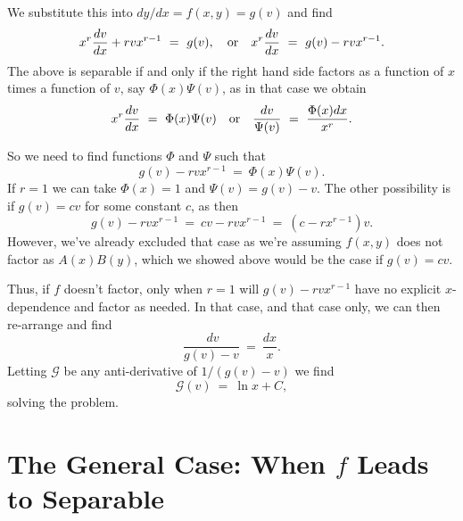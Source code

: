 \documentclass[12pt,reqno]{amsart}
\theoremstyle{plain}
\numberwithin{equation}{section} %
\numberwithin{table}{section} %
\numberwithin{figure}{section}
\begin{document}
We substitute this into $dy/dx = f(x,y) = g(v)$ and find \begin{equation} x^r \frac{dv}{dx} + rvx^{r-1} \ = \ g(v), \ \ \ {\rm or} \ \ \ x^r \frac{dv}{dx} \ = \ g(v) - r v x^{r-1}. \end{equation}
The above is separable if and only if the right hand side factors as a function of $x$ times a function of $v$, say $\Phi(x) \Psi(v)$, as in that case we obtain \begin{equation} x^r \frac{dv}{dx} \ = \ \Phi(x) \Psi(v) \ \ \ {\rm or} \ \ \ \frac{dv}{\Psi(v)} \ = \ \frac{\Phi(x) dx}{x^r}.\end{equation}

So we need to find functions $\Phi$ and $\Psi$ such that \begin{equation} g(v) - r v x^{r-1} \ = \ \Phi(x) \Psi(v). \end{equation} If $r=1$ we can take $\Phi(x) = 1$ and $\Psi(v) = g(v) - v$. The other possibility is if $g(v) = c v$ for some constant $c$, as then \begin{equation} g(v) - r v x^{r-1} \ = \ c v - r v x^{r-1} \ = \ \left(c - r x^{r-1}\right) v. \end{equation}  However, we've already excluded that case as we're assuming $f(x,y)$ does not factor as $A(x) B(y)$, which we showed above would be the case if $g(v) = c v$.

Thus, if $f$ doesn't factor, only when $r=1$ will $g(v) - r v x^{r-1}$ have no explicit $x$-dependence and factor as needed. In that case, and that case only, we can then re-arrange and find \begin{equation} \frac{\ dv}{g(v) - v} \ = \ \frac{dx}{x}. \end{equation} Letting $\mathcal{G}$ be any anti-derivative of $1/(g(v) - v)$ we find \begin{equation} \mathcal{G}(v) \ = \ \ln x + C, \end{equation} solving the problem.


\section{The General Case: When $f$ Leads to Separable}\label{sec:proofmaingeneralcase}
\end{document}
